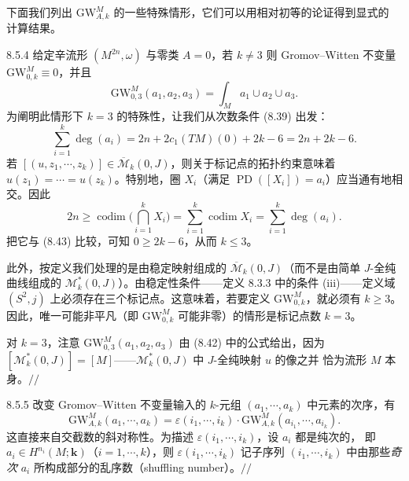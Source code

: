 下面我们列出 $\mathrm{GW}^M_{A,k}$ 的一些特殊情形，它们可以用相对初等的论证得到显式的
计算结果。

\begin{wexam}{8.5.4}
给定辛流形 $(M^{2n},\omega)$ 与零类 $A=0$，若 $k\ne3$ 则 Gromov--Witten 不变量
$\mathrm{GW}^M_{0,k}\equiv0$，并且
\begin{equation}
  \mathrm{GW}^M_{0,3}(a_1,a_2,a_3)=\int_Ma_1\cup a_2\cup a_3 .
  \tag{8.42}
\end{equation}
为阐明此情形下 $k=3$ 的特殊性，让我们从次数条件 (8.39) 出发：
\begin{equation}
  \sum_{i=1}^k\deg(a_i)=2n+2c_1(TM)(0)+2k-6=2n+2k-6 .
  \tag{8.43}
\end{equation}
若 $[(u,z_1,\cdots,z_k)]\in\overline{\mathcal{M}}_k(0,J)$，则关于标记点的拓扑约束意味着
$u(z_1)=\cdots=u(z_k)$。特别地，圈 $X_i$（满足
$\operatorname{PD}([X_i])=a_i$）应当通有地相交。因此
\[
  2n\ge\operatorname{codim}\Big(\bigcap_{i=1}^kX_i\Big)
  =\sum_{i=1}^k\operatorname{codim}X_i=\sum_{i=1}^k\deg(a_i).
\]
把它与 (8.43) 比较，可知 $0\ge2k-6$，从而 $k\le3$。

此外，按定义我们处理的是由稳定映射组成的
$\overline{\mathcal{M}}_k(0,J)$（而不是由简单 $J$-全纯曲线组成的
$\mathcal{M}^*_k(0,J)$）。由稳定性条件——定义 8.3.3 中的条件 (iii)——定义域
$(S^2,j)$ 上必须存在三个标记点。这意味着，若要定义 $\mathrm{GW}^M_{0,k}$，就必须有
$k\ge3$。因此，唯一可能非平凡（即 $\mathrm{GW}^M_{0,k}$ 可能非零）的情形是标记点数
$k=3$。

对 $k=3$，注意 $\mathrm{GW}^M_{0,3}(a_1,a_2,a_3)$ 由 (8.42) 中的公式给出，因为
$[\mathcal{M}^*_k(0,J)]=[M]$——$\mathcal{M}^*_k(0,J)$ 中 $J$-全纯映射 $u$ 的像之并
恰为流形 $M$ 本身。\hspace*{\fill}$//$
\end{wexam}
\begin{wexam}{8.5.5}
改变 Gromov--Witten 不变量输入的 $k$-元组 $(a_1,\cdots,a_k)$ 中元素的次序，有
\begin{equation}
  \mathrm{GW}^M_{A,k}(a_1,\cdots,a_k)
  =\varepsilon(i_1,\cdots,i_k)\cdot
  \mathrm{GW}^M_{A,k}(a_{i_1},\cdots,a_{i_k}).
  \tag{8.44}
\end{equation}
这直接来自交截数的斜对称性。为描述 $\varepsilon(i_1,\cdots,i_k)$，设 $a_i$ 都是纯次的，
即 $a_i\in H^{n_i}(M;\mathbf{k})$（$i=1,\cdots,k$），则
$\varepsilon(i_1,\cdots,i_k)$ 记子序列 $(i_1,\cdots,i_k)$ 中由那些\emph{奇次}
$a_i$ 所构成部分的乱序数（shuffling number）。\hspace*{\fill}$//$
\end{wexam}

